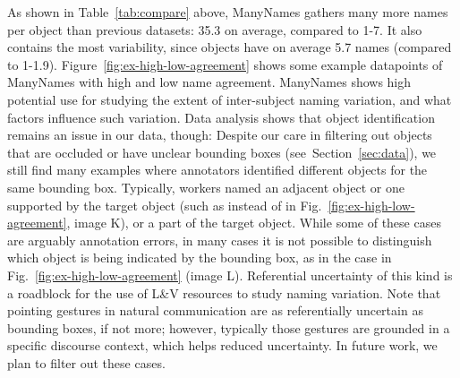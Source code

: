 As shown in Table~\ref{tab:compare} above, ManyNames gathers many more names per object than previous datasets: 35.3 on average, compared to 1-7.
It also contains the most variability, since objects have on average 5.7 names (compared to 1-1.9).
Figure~\ref{fig:ex-high-low-agreement} shows some example datapoints of ManyNames with high and low name agreement.
ManyNames 
shows high potential use for studying the extent of inter-subject naming variation, and what factors influence such variation.
Data analysis shows that object identification remains an issue in our data, though: Despite our care in filtering out objects that are occluded or have unclear bounding boxes (see\ Section~\ref{sec:data}), we still find many examples where annotators identified different objects for the same bounding box. 
Typically, workers named an adjacent object or one supported by the target object (such as  instead of  in Fig.~\ref{fig:ex-high-low-agreement}, image K), or a part of the target object.
While some of these cases are arguably annotation errors, in many cases it is not possible to distinguish which object is being indicated by the bounding box, as in the  case in Fig.~\ref{fig:ex-high-low-agreement} (image L).
Referential uncertainty of this kind is a roadblock for the use of L\&V resources to study naming variation.
Note that pointing gestures in natural communication are as referentially uncertain as bounding boxes, if not more; however, typically those gestures are grounded in a specific discourse context, which helps reduced uncertainty.
In future work, we plan to filter out these cases.

